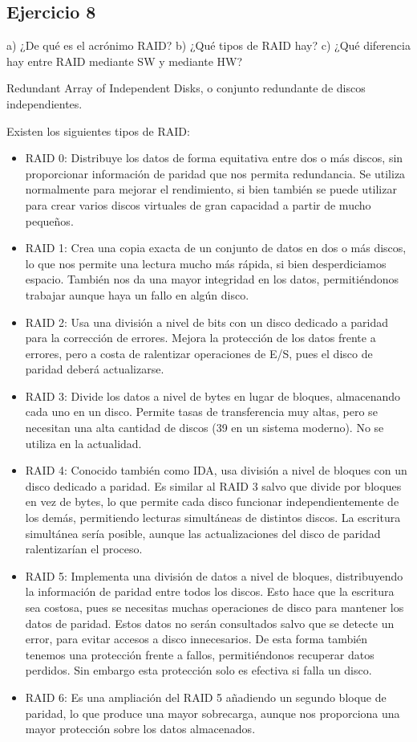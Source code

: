 \documentclass[a4paper, 11pt]{article} %
\begin{document}
\subsection*{Ejercicio 8}
a) ¿De qué es el acrónimo RAID? b) ¿Qué tipos de RAID hay? c) ¿Qué
diferencia hay entre RAID mediante SW y mediante HW? 

Redundant Array of Independent Disks, o conjunto redundante de discos independientes. 

Existen los siguientes tipos de RAID: 
\begin{itemize}
\item RAID 0: Distribuye los datos de forma equitativa entre dos o más discos, sin proporcionar información de paridad que nos permita redundancia. Se utiliza normalmente para mejorar el rendimiento, si bien también se puede utilizar para crear varios discos virtuales de gran capacidad a partir de mucho pequeños. 
\item RAID 1: Crea una copia exacta de un conjunto de datos en dos o más discos, lo que nos permite una lectura mucho más rápida, si bien desperdiciamos espacio. También nos da una mayor integridad en los datos, permitiéndonos trabajar aunque haya un fallo en algún disco. 
\item RAID 2: Usa una división a nivel de bits con un disco dedicado a paridad para la corrección de errores. Mejora la protección de los datos frente a errores, pero a costa de ralentizar operaciones de E/S, pues el disco de paridad deberá actualizarse. 
\item RAID 3: Divide los datos a nivel de bytes en lugar de bloques, almacenando cada uno en un disco. Permite tasas de transferencia muy altas, pero se necesitan una alta cantidad de discos (39 en un sistema moderno). No se utiliza en la actualidad. 
\item RAID 4: Conocido también como IDA, usa división a nivel de bloques con un disco dedicado a paridad. Es similar al RAID 3 salvo que divide por bloques en vez de bytes, lo que permite cada disco funcionar independientemente de los demás, permitiendo lecturas simultáneas de distintos discos. La escritura simultánea sería posible, aunque las actualizaciones del disco de paridad ralentizarían el proceso. 
\item RAID 5: Implementa una división de datos a nivel de bloques, distribuyendo la información de paridad entre todos los discos. Esto hace que la escritura sea costosa, pues se necesitas muchas operaciones de disco para mantener los datos de paridad. Estos datos no serán consultados salvo que se detecte un error, para evitar accesos a disco innecesarios. De esta forma también tenemos una protección frente a fallos, permitiéndonos recuperar datos perdidos. Sin embargo esta protección solo es efectiva si falla un disco. 
\item RAID 6: Es una ampliación del RAID 5 añadiendo un segundo bloque de paridad, lo que produce una mayor sobrecarga, aunque nos proporciona una mayor protección sobre los datos almacenados. 

\end{itemize}
\end{document}
